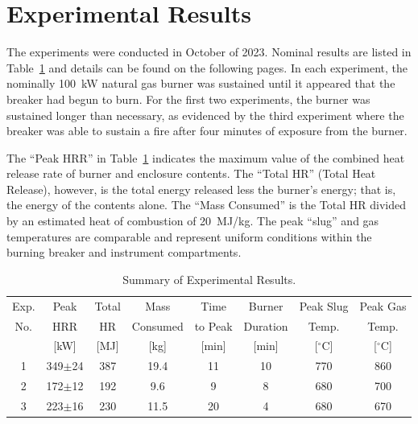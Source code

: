 \documentclass[12pt]{article}
\begin{document}
\clearpage


\section{Experimental Results}

The experiments were conducted in October of 2023. Nominal results are listed in Table~\ref{matrix} and details can be found on the following pages. In each experiment, the nominally 100~kW natural gas burner was sustained until it appeared that the breaker had begun to burn. For the first two experiments, the burner was sustained longer than necessary, as evidenced by the third experiment where the breaker was able to sustain a fire after four minutes of exposure from the burner.

The ``Peak HRR'' in Table~\ref{matrix} indicates the maximum value of the combined heat release rate of burner and enclosure contents. The ``Total HR'' (Total Heat Release), however, is the total energy released less the burner's energy; that is, the energy of the contents alone. The ``Mass Consumed'' is the Total HR divided by an estimated heat of combustion of 20~MJ/kg. The peak ``slug'' and gas temperatures are comparable and represent uniform conditions within the burning breaker and instrument compartments.


\begin{table}[ht]
\begin{center}
\caption[Summary of Experimental Results]{Summary of Experimental Results.}
\label{matrix}
\begin{tabular}{|c|c|c|c|c|c|c|c|}
\hline
Exp.   & Peak           & Total     	& Mass          	& Time             & Burner       & Peak Slug    & Peak Gas      \\
No.    & HRR            & HR            & Consumed          & to Peak          & Duration     & Temp.        & Temp.         \\
       & [kW]      	    & [MJ]	        & [kg]        		& [min]  		   & [min] 	      & [$^\circ$C]  & [$^\circ$C]   \\ \hline
1	   & 349$\pm$24	    & 387	    	& 19.4	          	& 11          	   & 10           & 770          & 860           \\ \hline
2	   & 172$\pm$12	    & 192	    	& 9.6	          	& 9	               & 8            & 680          & 700           \\ \hline
3	   & 223$\pm$16	    & 230	        & 11.5	           	& 20        	   & 4            & 680          & 670           \\ \hline
\end{tabular}
\end{center}
\end{table}
\end{document}

